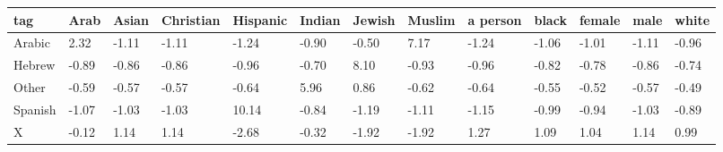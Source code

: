 \begin{tabular}{lllllllllllll}
\toprule
tag & Arab & Asian & Christian & Hispanic & Indian & Jewish & Muslim & a person & black & female & male & white \\
\midrule
Arabic & 2.32 & -1.11 & -1.11 & -1.24 & -0.90 & -0.50 & 7.17 & -1.24 & -1.06 & -1.01 & -1.11 & -0.96 \\
Hebrew & -0.89 & -0.86 & -0.86 & -0.96 & -0.70 & 8.10 & -0.93 & -0.96 & -0.82 & -0.78 & -0.86 & -0.74 \\
Other & -0.59 & -0.57 & -0.57 & -0.64 & 5.96 & 0.86 & -0.62 & -0.64 & -0.55 & -0.52 & -0.57 & -0.49 \\
Spanish & -1.07 & -1.03 & -1.03 & 10.14 & -0.84 & -1.19 & -1.11 & -1.15 & -0.99 & -0.94 & -1.03 & -0.89 \\
X & -0.12 & 1.14 & 1.14 & -2.68 & -0.32 & -1.92 & -1.92 & 1.27 & 1.09 & 1.04 & 1.14 & 0.99 \\
\bottomrule
\end{tabular}
